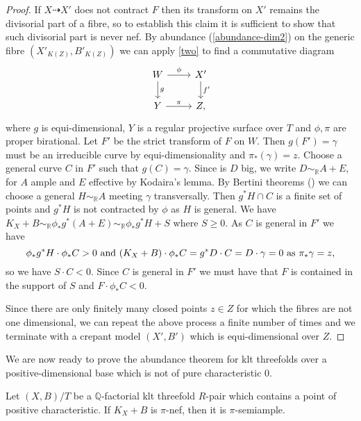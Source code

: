 \begin{proof}
	If $X\dashrightarrow X'$ does not contract $F$ then its transform on $X'$ remains the divisorial part of a fibre, so to establish this claim it is sufficient to show that such divisorial part is never nef. 
	By abundance (\autoref{abundance-dim2}) on the generic fibre $(X'_{K(Z)},B'_{K(Z)})$ we can apply \autoref{two} to find a commutative diagram 
	\[
	\begin{tikzcd}
	W \arrow[d, "g"] \arrow[r, "\phi"] & X' \arrow[d, "f'"]  \\
	Y\arrow[r, "\pi"]           & Z,              
	\end{tikzcd}
	\]
	where $g$ is equi-dimensional, $Y$ is a regular projective surface over $T$ and $\phi, \pi$ are proper birational.
	Let $F'$ be the strict transform of $F$ on $W$. Then $g(F')=\gamma$ must be an irreducible curve by equi-dimensionality and $\pi_*(\gamma)=z$. Choose a general curve $C$ in $F'$ such that $g(C)=\gamma$.
	Since is $D$ big, we write $D\sim_{\mathbb{R}} A+E$, for $A$ ample and $E$ effective by Kodaira's lemma.
	By Bertini theorems (\cite[Theorem 2.15]{bhatt2020}) we can choose a general $H \sim_{\mathbb{R}} A$ meeting $\gamma$ transversally. 
	Then $g^{*}H \cap C$ is a finite set of points and $g^{*}H$ is not contracted by $\phi$ as $H$ is general.
	We have $K_{X}+B \sim_{\mathbb{R}}\phi_{*}g^{*}(A+E) \sim_{\mathbb{R}}\phi_{*}g^{*}H+S$ where $S \geq 0$. As $C$ is general in $F'$ we have
	$$\phi_{*}g^{*}H \cdot \phi_{*}C >0 \textup{ and } (K_{X}+B)\cdot \phi_{*}C=g^{*}D \cdot C=D \cdot \gamma=0 \text{ as } \pi_*\gamma=z,$$ so we have $S \cdot C <0$. Since $C$ is general in $F'$ we must have that $F$ is contained in the support of $S$ and $F \cdot \phi_{*}C <0$.
	
	Since there are only finitely many closed points $z \in Z$ for which the fibres are not one dimensional, we can repeat the above process a finite number of times and we terminate with a crepant model $(X',B')$ which is equi-dimensional over $Z$.	
\end{proof}

We are now ready to prove the abundance theorem for klt threefolds over a positive-dimensional base which is not of pure characteristic $0$.

\begin{theorem}\label{abundance}
	Let $(X,B)/T$ be a $\mathbb{Q}$-factorial klt threefold $R$-pair which contains a point of positive characteristic. If $K_X+B$ is $\pi$-nef, then it is $\pi$-semiample.
\end{theorem}

